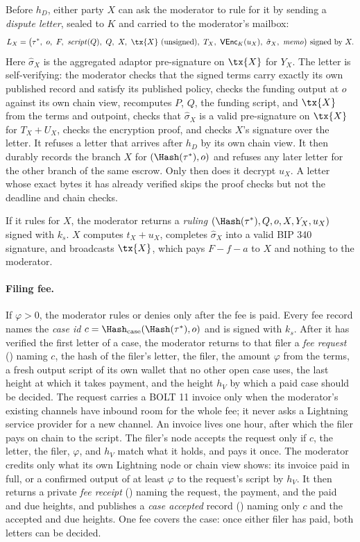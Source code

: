 Before $h_D$, either party $X$ can ask the moderator to rule for it by sending a \emph{dispute letter}, sealed to $K$ and carried to the moderator's mailbox:
\[
  L_X = \bigl(\tau^\ast,\ o,\ F,\ \mathit{script}(Q),\ Q,\ X,\ \tx{X}\ \text{(unsigned)},\ T_X,\ \mathsf{VEnc}_K(u_X),\ \hat\sigma_X,\ \mathit{memo}\bigr)\ \text{signed by } X.
\]
Here $\hat\sigma_X$ is the aggregated adaptor pre-signature on $\tx{X}$ for $Y_X$. The letter is self-verifying: the moderator checks that the signed terms carry exactly its own published record and satisfy its published policy, checks the funding output at $o$ against its own chain view, recomputes $P$, $Q$, the funding script, and $\tx{X}$ from the terms and outpoint, checks that $\hat\sigma_X$ is a valid pre-signature on $\tx{X}$ for $T_X+U_X$, checks the encryption proof, and checks $X$'s signature over the letter. It refuses a letter that arrives after $h_D$ by its own chain view. It then durably records the branch $X$ for $(\Hash(\tau^\ast),o)$ and refuses any later letter for the other branch of the same escrow. Only then does it decrypt $u_X$. A letter whose exact bytes it has already verified skips the proof checks but not the deadline and chain checks.

If it rules for $X$, the moderator returns a \emph{ruling} $(\Hash(\tau^\ast), Q, o, X, Y_X, u_X)$ signed with $k_s$. $X$ computes $t_X+u_X$, completes $\hat\sigma_X$ into a valid BIP 340 signature, and broadcasts $\tx{X}$, which pays $F-f-a$ to $X$ and nothing to the moderator.

\paragraph{Filing fee.} If $\varphi>0$, the moderator rules or denies only after the fee is paid. Every fee record names the \emph{case id} $c=\Hash_{\mathrm{case}}(\Hash(\tau^\ast),o)$ and is signed with $k_s$. After it has verified the first letter of a case, the moderator returns to that filer a \emph{fee request} () naming $c$, the hash of the filer's letter, the filer, the amount $\varphi$ from the terms, a fresh output script of its own wallet that no other open case uses, the last height at which it takes payment, and the height $h_V$ by which a paid case should be decided. The request carries a BOLT 11 invoice only when the moderator's existing channels have inbound room for the whole fee; it never asks a Lightning service provider for a new channel. An invoice lives one hour, after which the filer pays on chain to the script. The filer's node accepts the request only if $c$, the letter, the filer, $\varphi$, and $h_V$ match what it holds, and pays it once. The moderator credits only what its own Lightning node or chain view shows: its invoice paid in full, or a confirmed output of at least $\varphi$ to the request's script by $h_V$. It then returns a private \emph{fee receipt} () naming the request, the payment, and the paid and due heights, and publishes a \emph{case accepted} record () naming only $c$ and the accepted and due heights. One fee covers the case: once either filer has paid, both letters can be decided.

